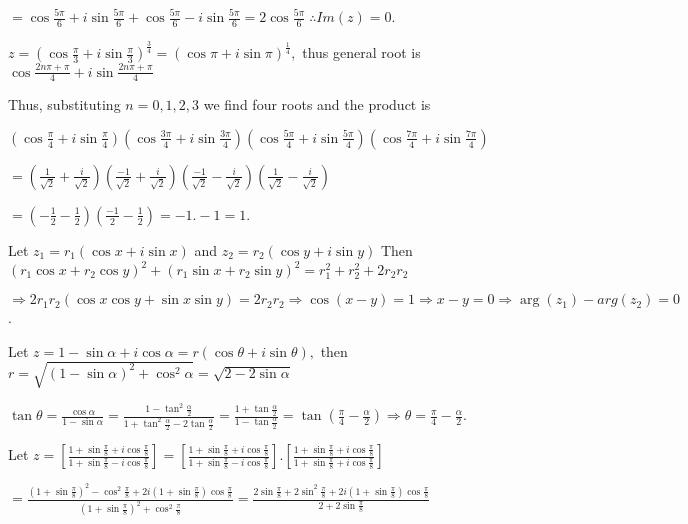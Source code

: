   $= \cos\frac{5\pi}{6} + i\sin\frac{5\pi}{6} + \cos\frac{5\pi}{6} - i\sin\frac{5\pi}{6} =
  2\cos\frac{5\pi}{6}\;\therefore Im(z) = 0$.
\item $z = \left(\cos\frac{\pi}{3} + i\sin\frac{\pi}{3}\right)^{\frac{3}{4}} = \left(\cos\pi +
  i\sin\pi\right)^{\frac{1}{4}},$ thus general root is $\cos\frac{2n\pi + \pi}{4} + i\sin\frac{2n\pi +
    \pi}{4}$

  Thus, substituting $n = 0, 1, 2, 3$ we find four roots and the product is

  $\left(\cos\frac{\pi}{4} + i\sin\frac{\pi}{4}\right)\left(\cos\frac{3\pi}{4} +
  i\sin\frac{3\pi}{4}\right)\left(\cos\frac{5\pi}{4} + i\sin\frac{5\pi}{4}\right)\left(\cos\frac{7\pi}{4} +
  i\sin\frac{7\pi}{4}\right)$

  $= \left(\frac{1}{\sqrt{2}} + \frac{i}{\sqrt{2}}\right)\left(\frac{-1}{\sqrt{2}} +
  \frac{i}{\sqrt{2}}\right)\left(\frac{-1}{\sqrt{2}} - \frac{i}{\sqrt{2}}\right)\left(\frac{1}{\sqrt{2}} -
  \frac{i}{\sqrt{2}}\right)$

  $= \left(-\frac{1}{2} - \frac{1}{2}\right)\left(\frac{-1}{2} - \frac{1}{2}\right) = -1.-1 = 1$.
\item Let $z_1 = r_1(\cos x + i\sin x)$ and $z_2 = r_2(\cos y + i\sin y)$ Then $(r_1\cos x + r_2\cos y)^2 +
  (r_1\sin x+ r_2\sin y)^2 = r_1^2 + r_2^2 + 2r_2r_2$

  $\Rightarrow 2r_1r_2(\cos x\cos y + \sin x\sin y) = 2r_2r_2 \Rightarrow \cos(x - y) = 1 \Rightarrow x - y
  = 0 \Rightarrow \arg(z_1) - arg(z_2) = 0$.
\item Let $z = 1 - \sin\alpha + i\cos\alpha = r(\cos\theta + i\sin\theta),$ then $r = \sqrt{(1 -
  \sin\alpha)^2 + \cos^2\alpha} = \sqrt{2 - 2\sin\alpha}$

  $\tan\theta = \frac{\cos\alpha}{1 - \sin\alpha} = \frac{1 - \tan^2\frac{\alpha}{2}}{1 +
  \tan^2\frac{\alpha}{2} - 2\tan\frac{\alpha}{2}} = \frac{1 + \tan\frac{\alpha}{2}}{1 -
  \tan\frac{\alpha}{2}} = \tan\left(\frac{\pi}{4} -\frac{\alpha}{2}\right)\Rightarrow \theta = \frac{\pi}{4}
  - \frac{\alpha}{2}$.
\item Let $z = \left[\frac{1 + \sin\frac{\pi}{8} + i\cos\frac{\pi}{8}}{1 + \sin\frac{\pi}{8} -
    i\cos\frac{\pi}{8}}\right] = \left[\frac{1 + \sin\frac{\pi}{8} + i\cos\frac{\pi}{8}}{1 +
    \sin\frac{\pi}{8} - i\cos\frac{\pi}{8}}\right]. \left[\frac{1 + \sin\frac{\pi}{8} +
    i\cos\frac{\pi}{8}}{1 + \sin\frac{\pi}{8} + i\cos\frac{\pi}{8}}\right]$

  $= \frac{\left(1 + \sin\frac{\pi}{8}\right)^2 - \cos^2\frac{\pi}{8} + 2i(1 +
  \sin\frac{\pi}{8})\cos\frac{\pi}{8}}{\left(1 + \sin\frac{\pi}{8}\right)^2 + \cos^2\frac{\pi}{8}} =
  \frac{2\sin\frac{\pi}{8} + 2\sin^2\frac{\pi}{8} + 2i(1 + \sin\frac{\pi}{8})\cos\frac{\pi}{8}}{2 +
    2\sin\frac{\pi}{8}}$

